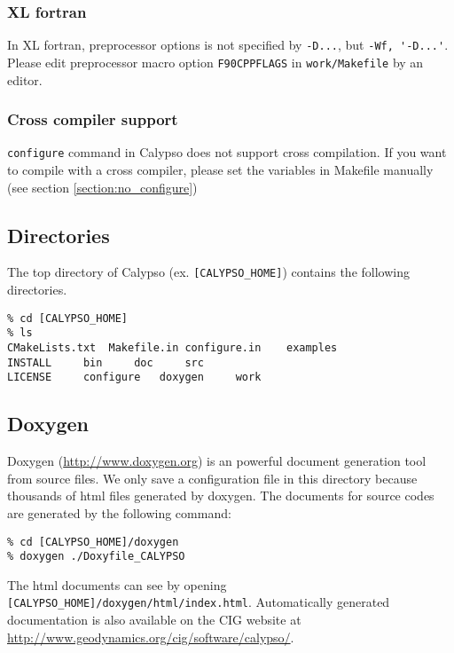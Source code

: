 \subsubsection*{XL fortran}
In XL fortran, preprocessor options is not specified by \verb|-D...|, but \verb|-Wf, '-D...'|. Please edit preprocessor macro option \verb|F90CPPFLAGS| in \verb|work/Makefile| by an editor.

\subsubsection*{Cross compiler support}
{\tt configure} command in Calypso does not support cross compilation. If you want to compile with a cross compiler, please set the variables in Makefile manually (see section \ref{section:no_configure})

\subsection{Directories}

The top directory of Calypso (ex. \verb|[CALYPSO_HOME]|) contains the following directories.
\begin{verbatim}
% cd [CALYPSO_HOME]
% ls
CMakeLists.txt	Makefile.in	configure.in	examples
INSTALL		bin		doc		src
LICENSE		configure	doxygen		work

\end{verbatim}


\subsection{Doxygen}
Doxygen (\url{http://www.doxygen.org}) is an powerful document generation tool from source files. We only save a configuration file in this directory because thousands of html files generated by doxygen. The documents for source codes are generated by the following command:
% 
\begin{verbatim}
% cd [CALYPSO_HOME]/doxygen
% doxygen ./Doxyfile_CALYPSO
\end{verbatim}
%
The html documents can see by opening \verb|[CALYPSO_HOME]/doxygen/html/index.html|.  Automatically generated documentation is also available on the CIG website at \url{http://www.geodynamics.org/cig/software/calypso/}.

